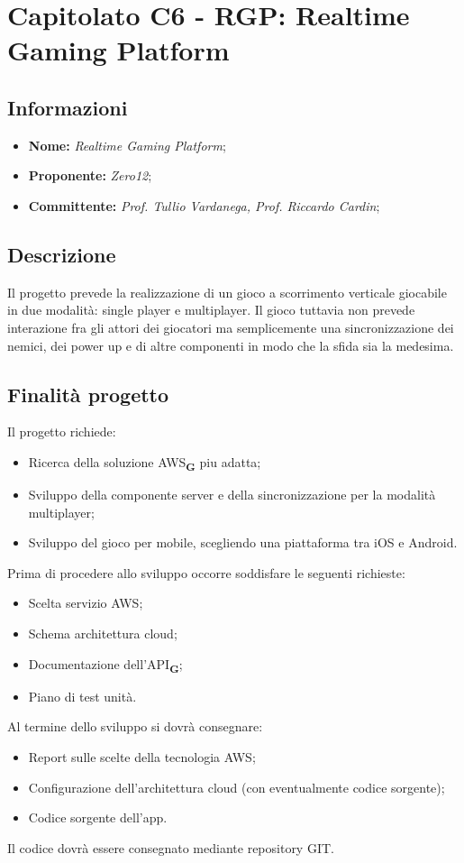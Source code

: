 \section{Capitolato C6 - RGP: Realtime Gaming Platform}
\subsection{Informazioni}
\begin{itemize}
    \item \textbf{Nome:} \textit{Realtime Gaming Platform};
    \item \textbf{Proponente:} \textit{Zero12};
    \item \textbf{Committente:} \textit{Prof. Tullio Vardanega, Prof. Riccardo Cardin};
\end{itemize}
\subsection{Descrizione}
Il progetto prevede la realizzazione di un gioco a scorrimento verticale giocabile in due modalità: single player e multiplayer. Il gioco tuttavia non prevede interazione fra gli attori dei giocatori ma semplicemente una sincronizzazione dei nemici, dei power up e di altre componenti in modo che la sfida sia la medesima.
\subsection{Finalità progetto}
Il progetto richiede:
\begin{itemize}
    \item Ricerca della soluzione AWS\textsubscript{\textbf{G}} piu adatta;
    \item Sviluppo della componente server e della sincronizzazione per la modalità multiplayer;
    \item Sviluppo del gioco per mobile, scegliendo una piattaforma tra iOS e Android.
\end{itemize}
Prima di procedere allo sviluppo occorre soddisfare le seguenti richieste:
\begin{itemize}
    \item Scelta servizio AWS;
    \item Schema architettura cloud;
    \item Documentazione dell'API\textsubscript{\textbf{G}};
    \item Piano di test unità.
\end{itemize}
Al termine dello sviluppo si dovrà consegnare:
\begin{itemize}
    \item Report sulle scelte della tecnologia AWS;
    \item Configurazione dell'architettura cloud (con eventualmente codice sorgente);
    \item Codice sorgente dell'app.
\end{itemize}
Il codice dovrà essere consegnato mediante repository GIT.
